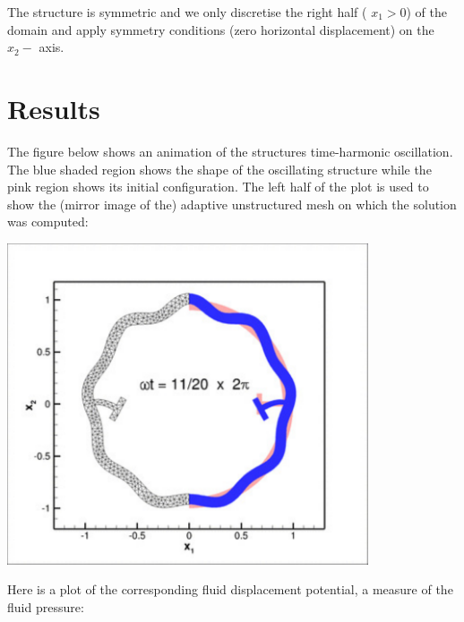 The structure is symmetric and we only discretise the right half ( $ x_1 > 0 $) of the domain and apply symmetry conditions (zero horizontal displacement) on the $ x_2-$ axis.



 

\hypertarget{index_results}{}\section{Results}\label{index_results}
The figure below shows an animation of the structure\textquotesingle{}s time-\/harmonic oscillation. The blue shaded region shows the shape of the oscillating structure while the pink region shows its initial configuration. The left half of the plot is used to show the (mirror image of the) adaptive unstructured mesh on which the solution was computed\+:

 
\begin{DoxyImage}
\includegraphics[width=0.8\textwidth]{anim}
\end{DoxyImage}


Here is a plot of the corresponding fluid displacement potential, a measure of the fluid pressure\+:

